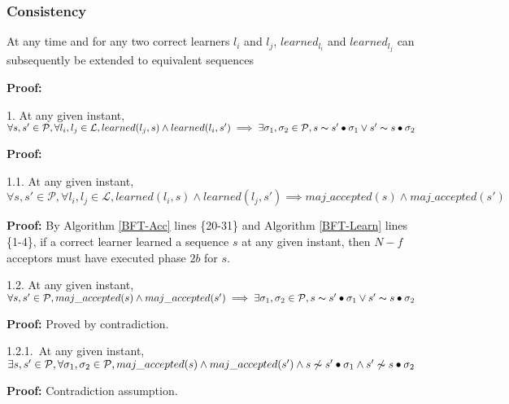 \subsubsection{Consistency}
\begin{theorem}At any time and for any two correct learners $l_i$ and $l_j$, $learned_{l_i}$ and $learned_{l_j}$ can subsequently be extended to equivalent sequences \par
\end{theorem} 
\textbf{Proof:} \par
\parbox{\linewidth}{\strut1. At any given instant, $\forall s,s' \in \mathcal{P}, \forall l_i,l_j \in \mathcal{L}, learned(l_j,s) \land learned(l_i,s') \implies \exists \sigma_1,\sigma_2 \in \mathcal{P}, s \thicksim s' \bullet \sigma_1 \lor s' \thicksim s \bullet \sigma_2$}  \par
\indent\indent\parbox{\linewidth}{\strut\textbf{Proof:} }\par
\indent\indent\indent\parbox{\linewidth-\algorithmicindent*3}{\strut1.1. At any given instant, $\forall s,s' \in \mathcal{P}, \forall l_i,l_j \in \mathcal{L}, learned(l_i,s) \land learned(l_j,s') \implies maj\_accepted(s) \land maj\_accepted(s')$} \par
\indent\indent\indent\indent\parbox{\linewidth-\algorithmicindent*4}{\strut\textbf{Proof:} By Algorithm \ref{BFT-Acc} lines \{20-31\} and Algorithm \ref{BFT-Learn} lines \{1-4\}, if a correct learner learned a sequence $s$ at any given instant, then $N-f$ acceptors must have executed phase $2b$ for $s$.}\par
\indent\indent\indent\parbox{\linewidth-\algorithmicindent*3}{\strut1.2. At any given instant, $\forall s,s' \in \mathcal{P}, maj\_accepted(s) \land maj\_accepted(s') \implies \exists \sigma_1,\sigma_2 \in \mathcal{P}, s \thicksim s' \bullet \sigma_1 \lor s' \thicksim s \bullet \sigma_2$}\par
\indent\indent\indent\indent\parbox{\linewidth}{\strut\textbf{Proof:} Proved by contradiction.}\par
\indent\indent\indent\indent\indent\parbox{\linewidth-\algorithmicindent*5}{\strut1.2.1.~At any given instant, $\exists s,s' \in \mathcal{P}, \forall \sigma_1,\sigma_2 \in \mathcal{P}, maj\_accepted(s) \land maj\_accepted(s') \wedge s \not\thicksim s' \bullet \sigma_1 \land s' \not\thicksim s \bullet \sigma_2$} \par
\indent\indent\indent\indent\indent\indent\parbox{\linewidth}{\strut\textbf{Proof:} Contradiction assumption.}\par

